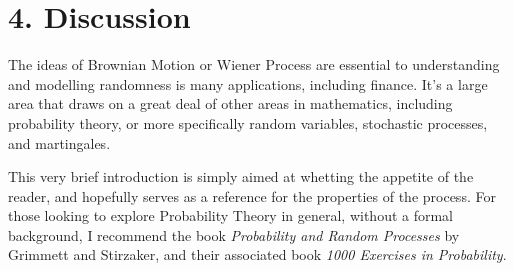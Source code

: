 \documentclass[11pt]{article}
\begin{document}
\section*{4. Discussion}
The ideas of Brownian Motion or Wiener Process are essential to understanding and modelling randomness is many applications, including finance. It's a large area that draws on a great deal of other areas in mathematics, including probability theory, or more specifically random variables, stochastic processes, and martingales. 

This very brief introduction is simply aimed at whetting the appetite of the reader, and hopefully serves as a reference for the properties of the process. For those looking to explore Probability Theory in general, without a formal background, I recommend the book \textit{Probability and Random Processes} by Grimmett and Stirzaker, and their associated book \textit{1000 Exercises in Probability}.
\end{document}
